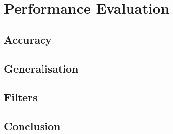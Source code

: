 \chapter{Performance Evaluation}
\label{eval}

\section{Accuracy}

\section{Generalisation}

\section{Filters}

\section{Conclusion}
